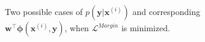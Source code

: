 \begin{figure}[t]
    \centering
    \caption{Two possible cases  of $p(\mathbf{y}|\mathbf{x}^{(i)})$ and corresponding $\mathbf{w}^\top\boldsymbol{\phi}(\mathbf{x}^{(i)},\mathbf{y})$, when $\mathcal{L}^{Margin}$ is minimized. } 
    \label{fig:M3N_outputs_both}
\end{figure}




